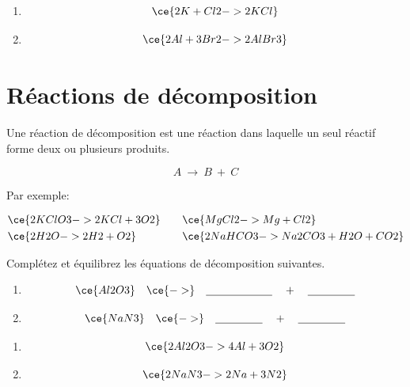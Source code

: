\documentclass[
  11pt,
  french,
  a4paper,
  openany]{book}
\begin{document}
\begin{Answer}

\begin{enumerate}
\def\labelenumi{\arabic{enumi}.}
\item
  \[\ce{2K + Cl2 -> 2KCl }\]
\item
  \[\ce{2 Al + 3 Br2 -> 2 AlBr3 }\]
\end{enumerate}


\end{Answer}

\hypertarget{ruxe9actions-de-duxe9composition}{%
\section{Réactions de décomposition}\label{ruxe9actions-de-duxe9composition}}

Une réaction de décomposition est une réaction dans laquelle un seul réactif forme deux ou plusieurs produits.

\[ A\ \longrightarrow\ B\ +\ C \]

Par exemple:

\[ \begin{split}
  & \ce{2KClO3 -> 2KCl + 3O2} \\
  & \ce{2H2O -> 2H2 + O2}
  \end{split}
  \qquad
  \begin{split}
  & \ce{MgCl2 -> Mg + Cl2} \\
  & \ce{2NaHCO3 -> Na2CO3 + H2O + CO2}
  \end{split} \]

\begin{Exercise}

Complétez et équilibrez les équations de décomposition suivantes.

\begin{enumerate}
\def\labelenumi{\arabic{enumi}.}
\item
  \[\ce{Al2O3} \quad \ce{->} \quad \underline{\hspace{6em}} \quad + \quad \underline{\hspace{1.5cm}}\]
\item
  \[\ce{NaN3} \quad \ce{->} \quad \underline{\hspace{1.5cm}} \quad + \quad \underline{\hspace{1.5cm}}\]
\end{enumerate}


\end{Exercise}

\begin{Answer}

\begin{enumerate}
\def\labelenumi{\arabic{enumi}.}
\item
  \[\ce{2 Al2O3 -> 4 Al + 3 O2}\]
\item
  \[\ce{2 NaN3 -> 2 Na + 3 N2}\]
\end{enumerate}


\end{Answer}
\end{document}
